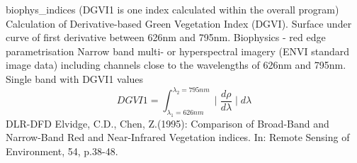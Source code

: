 %
{ %
biophys\_indices (DGVI1 is one index calculated within the overall program)
}
%
{ %
Calculation of Derivative-based Green Vegetation Index (DGVI). Surface under curve of first derivative between 626nm and 795nm.
}
%
{ %
Biophysics - red edge parametrisation
}
%
{ %
Narrow band multi- or hyperspectral imagery (ENVI standard image data) including channels close to the wavelengths of 626nm and 795nm.\bigskip
}
%
{ %
Single band with DGVI1 values
}
%
{ %
\begin{displaymath}
DGVI1 = \int _{\lambda_1 =626nm}^{\lambda_2 =795nm}	\mid \frac{d   \rho}{d  \lambda }\mid d \lambda
\end{displaymath}
}
%
{ %
DLR-DFD
}
%
{ %
Elvidge, C.D., Chen, Z.(1995): Comparison of Broad-Band and Narrow-Band Red and Near-Infrared Vegetation indices. In: Remote Sensing of Environment, 54, p.38-48.
}
